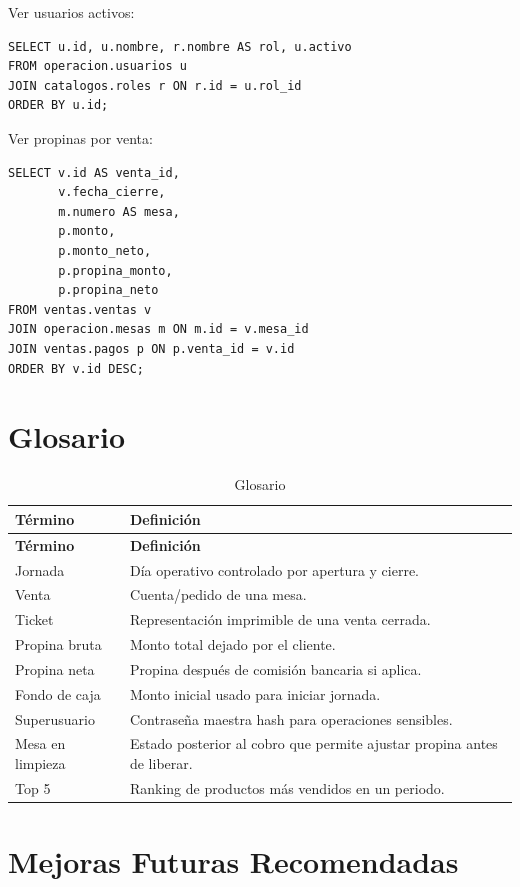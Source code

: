 \documentclass[11pt,letterpaper,openany]{report}
\begin{document}
Ver usuarios activos:

\begin{lstlisting}
SELECT u.id, u.nombre, r.nombre AS rol, u.activo
FROM operacion.usuarios u
JOIN catalogos.roles r ON r.id = u.rol_id
ORDER BY u.id;
\end{lstlisting}

Ver propinas por venta:

\begin{lstlisting}
SELECT v.id AS venta_id,
       v.fecha_cierre,
       m.numero AS mesa,
       p.monto,
       p.monto_neto,
       p.propina_monto,
       p.propina_neto
FROM ventas.ventas v
JOIN operacion.mesas m ON m.id = v.mesa_id
JOIN ventas.pagos p ON p.venta_id = v.id
ORDER BY v.id DESC;
\end{lstlisting}

\section{Glosario}

\begin{longtable}{p{}p{}}
\caption{Glosario}\\
\toprule
\textbf{Término} & \textbf{Definición}\\
\midrule
\endfirsthead
\toprule
\textbf{Término} & \textbf{Definición}\\
\midrule
\endhead
Jornada & Día operativo controlado por apertura y cierre.\\
Venta & Cuenta/pedido de una mesa.\\
Ticket & Representación imprimible de una venta cerrada.\\
Propina bruta & Monto total dejado por el cliente.\\
Propina neta & Propina después de comisión bancaria si aplica.\\
Fondo de caja & Monto inicial usado para iniciar jornada.\\
Superusuario & Contraseña maestra hash para operaciones sensibles.\\
Mesa en limpieza & Estado posterior al cobro que permite ajustar propina antes de liberar.\\
Top 5 & Ranking de productos más vendidos en un periodo.\\
\bottomrule
\end{longtable}

\section{Mejoras Futuras Recomendadas}
\end{document}
